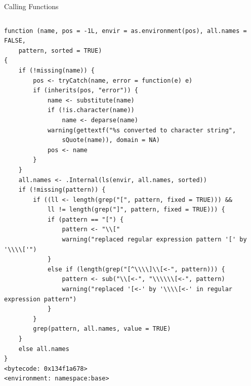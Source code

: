 \documentclass[
  11pt,
  ignorenonframetext,
]{beamer}
\begin{document}
\begin{frame}[fragile]{Calling Functions}
\begin{columns}[T,onlytextwidth]
\begin{column}{0.48\textwidth}
\begin{verbatim}
function (name, pos = -1L, envir = as.environment(pos), all.names = FALSE, 
    pattern, sorted = TRUE) 
{
    if (!missing(name)) {
        pos <- tryCatch(name, error = function(e) e)
        if (inherits(pos, "error")) {
            name <- substitute(name)
            if (!is.character(name)) 
                name <- deparse(name)
            warning(gettextf("%s converted to character string", 
                sQuote(name)), domain = NA)
            pos <- name
        }
    }
    all.names <- .Internal(ls(envir, all.names, sorted))
    if (!missing(pattern)) {
        if ((ll <- length(grep("[", pattern, fixed = TRUE))) && 
            ll != length(grep("]", pattern, fixed = TRUE))) {
            if (pattern == "[") {
                pattern <- "\\["
                warning("replaced regular expression pattern '[' by  '\\\\['")
            }
            else if (length(grep("[^\\\\]\\[<-", pattern))) {
                pattern <- sub("\\[<-", "\\\\\\[<-", pattern)
                warning("replaced '[<-' by '\\\\[<-' in regular expression pattern")
            }
        }
        grep(pattern, all.names, value = TRUE)
    }
    else all.names
}
<bytecode: 0x134f1a678>
<environment: namespace:base>
\end{verbatim}
\end{column}
\end{columns}
\end{frame}
\end{document}
